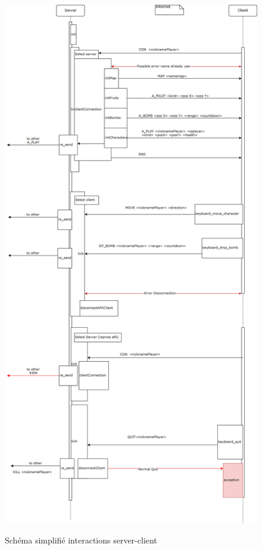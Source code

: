 \documentclass[a4paper]{article}
\begin{document}
\newpage
\begin{figure}[!htbp]
	\centering
	\includegraphics[height=0.9\textheight]{IMG_Latex/ProgrammLifeTime.jpg}\\
	\caption{Schéma simplifié interactions server-client}
	\label{shema/lifeTime}
\end{figure}
\end{document}
